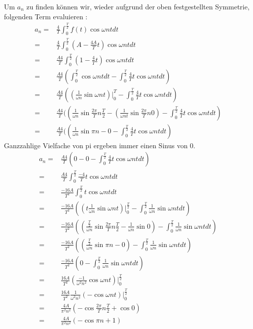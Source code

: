 \documentclass{article}
\begin{document}
    Um $a_n$ zu finden können wir, wieder aufgrund der oben festgestellten Symmetrie, folgenden Term evaluieren :
    \begin{eqnarray*}
        a_n = & \frac{4}{T}\int_{0}^{\frac{T}{2}}f(t)\cos\omega ntdt\\
        =&\frac{4}{T}\int_{0}^{\frac{T}{2}}(A-\frac{4A}{T}t)\cos\omega ntdt \\
        =&\frac{A4}{T}\int_{0}^{\frac{T}{2}}(1-\frac{4}{T}t)\cos\omega ntdt \\
        =&\frac{A4}{T}(\int_{0}^{\frac{T}{2}}\cos\omega ntdt-\int_{0}^{\frac{T}{2}}\frac{4}{T}t\cos\omega ntdt)\\
        =&\frac{A4}{T}((\frac{1}{\omega n}\sin\omega nt)\big |_0^{T}-\int_{0}^{\frac{T}{2}}\frac{4}{T}t\cos\omega ntdt)\\
        =&\frac{A4}{T}((\frac{1}{\omega n}\sin\frac{2\pi}{T} n\frac{T}{2}-(\frac{1}{\omega nt}\sin\frac{2\pi}{T} n 0)-\int_{0}^{\frac{T}{2}}\frac{4}{T}t\cos\omega ntdt)\\
        =&\frac{A4}{T}((\frac{1}{\omega n}\sin \pi n- 0 -\int_{0}^{\frac{T}{2}}\frac{4}{T}t\cos\omega ntdt)
    \end{eqnarray*}
    Ganzzahlige Vielfache von pi ergeben immer einen Sinus von 0.
    \begin{eqnarray*}
        a_n = & \frac{A4}{T}(0 - 0 -\int_{0}^{\frac{T}{2}}\frac{4}{T}t\cos\omega ntdt)\\
         = & \frac{A4}{T}\int_{0}^{\frac{T}{2}}\frac{-4}{T}t\cos\omega ntdt\\
         = & \frac{-16A}{T^2}\int_{0}^{\frac{T}{2}}t\cos\omega ntdt\\
         = & \frac{-16A}{T^2}((t \frac{1}{\omega n}\sin \omega n t)\big |_0^\frac{T}{2}-\int_0^{\frac{T}{2}}\frac{1}{\omega n}\sin \omega ntdt)\\
         = & \frac{-16A}{T^2}(( \frac{\frac{T}{2}}{\omega n}\sin \frac{2\pi}{T} n \frac{T}{2} - \frac{1}{\omega n}\sin 0) -\int_0^{\frac{T}{2}}\frac{1}{\omega n}\sin \omega ntdt)\\
         = & \frac{-16A}{T^2}(( \frac{\frac{T}{2}}{\omega n}\sin \pi n -  0) -\int_0^{\frac{T}{2}}\frac{1}{\omega n}\sin \omega ntdt)\\
         = & \frac{-16A}{T^2}( 0 -\int_0^{\frac{T}{2}}\frac{1}{\omega n}\sin \omega ntdt)\\
         = & \frac{16A}{T^2}(\frac{-1}{\omega^2 n^2}\cos\omega n t )\big |_0^{\frac{T}{2}}\\
         = & \frac{16A}{T^2}\frac{1}{\omega^2 n^2}(-\cos\omega n t )\big |_0^{\frac{T}{2}}\\
         = & \frac{4A}{\pi^2 n^2}(-\cos\frac{2\pi}{T}n\frac{T}{2}+\cos 0)\\
         = & \frac{4A}{\pi^2 n^2}(-\cos\pi n + 1)
    \end{eqnarray*}
\end{document}
